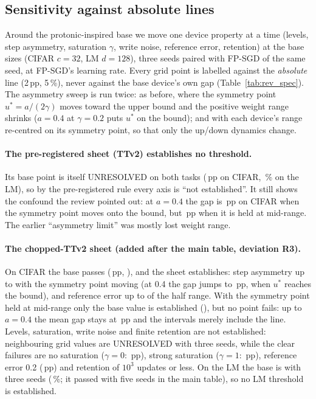 \subsection{Sensitivity against absolute lines}\label{sec:spec}
Around the protonic-inspired base we move one device property at a time (levels, step asymmetry, saturation $\gamma$, write
noise, reference error, retention) at the base sizes (CIFAR $c=32$, LM $d=128$), three seeds paired with FP-SGD of the same seed,
at FP-SGD's learning rate. Every grid point is labelled against the \emph{absolute} line (2\,pp, 5\,\%), never against the base
device's own gap (Table~\ref{tab:rev_spec}). The asymmetry sweep is run twice: as before, where the symmetry point
$u^*=a/(2\gamma)$ moves toward the upper bound and the positive weight range shrinks ($a=0.4$ at $\gamma=0.2$ puts $u^*$ on the
bound); and with each device's range re-centred on its symmetry point, so that only the up/down dynamics change.

\paragraph{The pre-registered sheet (TTv2) establishes no threshold.} Its base point is itself UNRESOLVED on both tasks
(\RVSpecTtvTwoCifarBaseGap\,pp on CIFAR, \RVSpecTtvTwoLmBaseGap\,\% on the LM), so by the pre-registered rule every axis is ``not
established''. It still shows the confound the review pointed out: at $a=0.4$ the gap is \RVSpecTtvTwoCifarAsymAtZeroPFourGap\,pp
on CIFAR when the symmetry point moves onto the bound, but \RVSpecTtvTwoCifarAsymFixedspAtZeroPFourGap\,pp when it is held at
mid-range. The earlier ``asymmetry limit'' was mostly lost weight range.

\paragraph{The chopped-TTv2 sheet (added after the main table, deviation R3).} On CIFAR the base passes
(\RVSpecCttvTwoCifarBaseGap\,pp, \RVSpecCttvTwoCifarBaseLabel), and the sheet establishes: step asymmetry up to
\RVSpecCttvTwoCifarAsymThr{} with the symmetry point moving (at 0.4 the gap jumps to \RVSpecCttvTwoCifarAsymAtZeroPFourGap\,pp,
when $u^*$ reaches the bound), and reference error up to \RVSpecCttvTwoCifarRefErrThr{} of the half range. With the symmetry
point held at mid-range only the base value is established (\RVSpecCttvTwoCifarAsymFixedspThr), but no point fails: up to
$a=0.4$ the mean gap stays at \RVSpecCttvTwoCifarAsymFixedspAtZeroPFourGap\,pp and the intervals merely include the line. Levels,
saturation, write noise and finite retention are not established: neighbouring grid values are UNRESOLVED with three seeds,
while the clear failures are no saturation ($\gamma=0$: \RVSpecCttvTwoCifarGammaAtZeroPZeroGap\,pp), strong saturation
($\gamma=1$: \RVSpecCttvTwoCifarGammaAtOnePZeroGap\,pp), reference error 0.2 (\RVSpecCttvTwoCifarRefErrAtZeroPTwoGap\,pp) and
retention of $10^3$ updates or less. On the LM the base is \RVSpecCttvTwoLmBaseLabel{} with three seeds
(\RVSpecCttvTwoLmBaseGap\,\%; it passed with five seeds in the main table), so no LM threshold is established.

